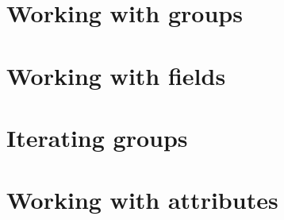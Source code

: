 \section{Working with groups}

\section{Working with fields}

\section{Iterating groups}

\section{Working with attributes}

